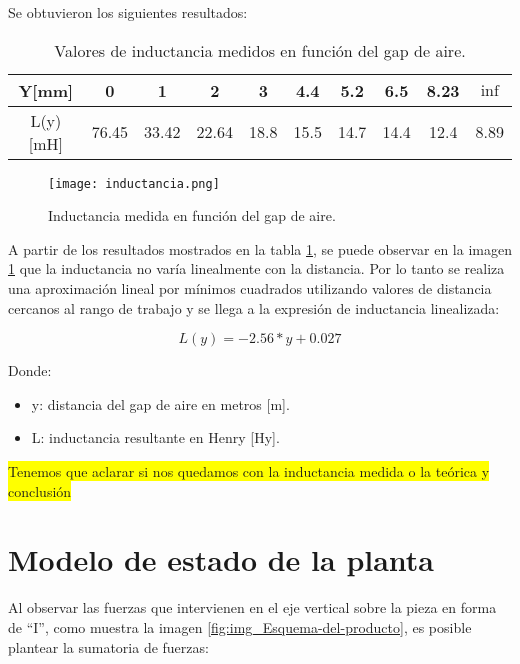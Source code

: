 \noindent Se obtuvieron los siguientes resultados:

\begin{table} [H]
	\begin{center}
		\begin{tabular}{| c | c | c | c | c | c | c | c | c | c |}
			\hline			
			Y[mm] & 0 & 1 & 2 & 3 & 4.4 & 5.2 & 6.5 & 8.23 & $\inf$ \\ \hline
			L(y)[mH] & 76.45 & 33.42 & 22.64 & 18.8 & 15.5 & 14.7 & 14.4 & 12.4 & 8.89\\ \hline
		\end{tabular}
		\caption{Valores de inductancia medidos en función del gap de aire.}
		\label{tab_mediciones_inductancia}
	\end{center}
\end{table}

\begin{figure} [H]
	\centering
	\texttt{[image: inductancia.png]}
	\caption{Inductancia medida en función del gap de aire.}
	\label{fig:img_inductancia_medida}
\end{figure}
\noindent A partir de los resultados mostrados en la tabla \ref{tab_mediciones_inductancia}, se puede observar en la imagen \ref{fig:img_inductancia_medida} que la inductancia no varía linealmente con la distancia. Por lo tanto se realiza una aproximación lineal por mínimos cuadrados utilizando valores de distancia cercanos al rango de trabajo y se llega a la expresión de inductancia linealizada:

\begin{equation}
	L(y)=-2.56*y+0.027
\end{equation}

\noindent Donde:
\begin{itemize}
	\item y: distancia del gap de aire en metros [m].
	\item L: inductancia resultante en Henry [Hy].
\end{itemize}
\colorbox{yellow}{Tenemos que aclarar si nos quedamos con la inductancia medida o la teórica y conclusión}

\section{Modelo de estado de la planta}

\noindent Al observar las fuerzas que intervienen en el eje vertical sobre la pieza en forma de ``I'', como muestra la imagen \ref{fig:img_Esquema-del-producto}, es posible plantear la sumatoria de fuerzas:

